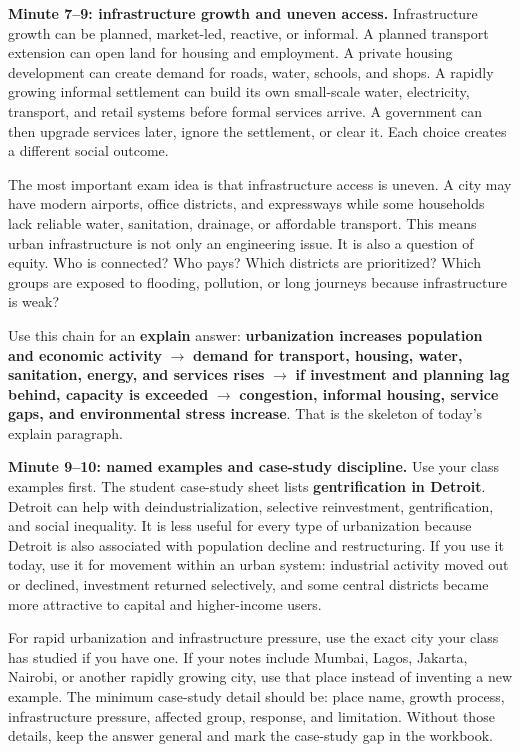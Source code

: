 \documentclass[11pt,a4paper]{article}
\newcommand{\term}[1]{\textcolor{HeadingBlue}{\textbf{#1}}}
\newcommand{\exam}[1]{\textcolor{AccentTeal}{\textbf{#1}}}
\begin{document}
\textbf{Minute 7--9: infrastructure growth and uneven access.}
Infrastructure growth can be planned, market-led, reactive, or informal. A
planned transport extension can open land for housing and employment. A private
housing development can create demand for roads, water, schools, and shops. A
rapidly growing informal settlement can build its own small-scale water,
electricity, transport, and retail systems before formal services arrive. A
government can then upgrade services later, ignore the settlement, or clear it.
Each choice creates a different social outcome.

The most important exam idea is that infrastructure access is uneven. A city may
have modern airports, office districts, and expressways while some households
lack reliable water, sanitation, drainage, or affordable transport. This means
urban infrastructure is not only an engineering issue. It is also a question of
equity. Who is connected? Who pays? Which districts are prioritized? Which
groups are exposed to flooding, pollution, or long journeys because
infrastructure is weak?

Use this chain for an \exam{explain} answer: \term{urbanization increases
population and economic activity} $\rightarrow$ \term{demand for transport,
housing, water, sanitation, energy, and services rises} $\rightarrow$ \term{if
investment and planning lag behind, capacity is exceeded} $\rightarrow$
\term{congestion, informal housing, service gaps, and environmental stress
increase}. That is the skeleton of today's explain paragraph.

\textbf{Minute 9--10: named examples and case-study discipline.}
Use your class examples first. The student case-study sheet lists
\term{gentrification in Detroit}. Detroit can help with deindustrialization,
selective reinvestment, gentrification, and social inequality. It is less useful
for every type of urbanization because Detroit is also associated with
population decline and restructuring. If you use it today, use it for movement
within an urban system: industrial activity moved out or declined, investment
returned selectively, and some central districts became more attractive to
capital and higher-income users.

For rapid urbanization and infrastructure pressure, use the exact city your
class has studied if you have one. If your notes include Mumbai, Lagos, Jakarta,
Nairobi, or another rapidly growing city, use that place instead of inventing a
new example. The minimum case-study detail should be: place name, growth
process, infrastructure pressure, affected group, response, and limitation.
Without those details, keep the answer general and mark the case-study gap in
the workbook.
\end{document}
